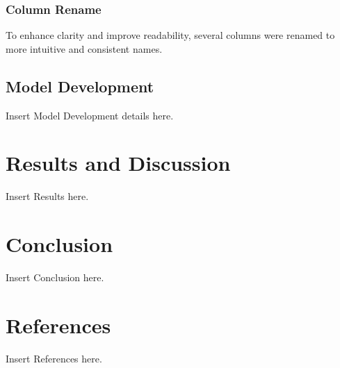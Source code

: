\documentclass[12pt]{article}
\begin{document}
\subsubsection{Column Rename}
To enhance clarity and improve readability, several columns were renamed to more intuitive and consistent names. 
\vspace{5pt}
\subsubsection{}


\subsubsection{}


\subsubsection{}


\subsubsection{}
\subsection{Model Development}
Insert Model Development details here.

\section{Results and Discussion}
Insert Results here.

\section{Conclusion}
Insert Conclusion here.

\section{References}
Insert References here.
\end{document}

